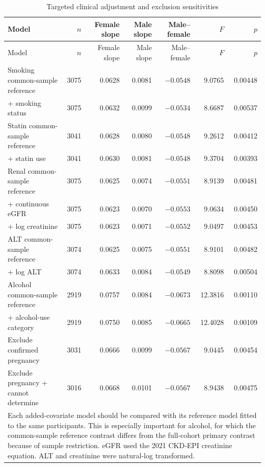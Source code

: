 \documentclass[11pt]{article}
\begin{document}
\begin{landscape}
\begin{longtable}{p{2.0in}rrrrrr}
\caption{Targeted clinical adjustment and exclusion sensitivities}
\label{tab:s3_targeted}\\
\toprule
Model & $n$ & Female slope & Male slope & Male--female & $F$ & $p$ \\
\midrule
\endfirsthead
\toprule
Model & $n$ & Female slope & Male slope & Male--female & $F$ & $p$ \\
\midrule
\endhead
Smoking common-sample reference & 3075 & 0.0628 & 0.0081 & $-0.0548$ & 9.0765 & 0.00448 \\
+ smoking status & 3075 & 0.0632 & 0.0099 & $-0.0534$ & 8.6687 & 0.00537 \\
\addlinespace
Statin common-sample reference & 3041 & 0.0628 & 0.0080 & $-0.0548$ & 9.2612 & 0.00412 \\
+ statin use & 3041 & 0.0630 & 0.0081 & $-0.0548$ & 9.3704 & 0.00393 \\
\addlinespace
Renal common-sample reference & 3075 & 0.0625 & 0.0074 & $-0.0551$ & 8.9139 & 0.00481 \\
+ continuous eGFR & 3075 & 0.0623 & 0.0070 & $-0.0553$ & 9.0634 & 0.00450 \\
+ log creatinine & 3075 & 0.0623 & 0.0071 & $-0.0552$ & 9.0497 & 0.00453 \\
\addlinespace
ALT common-sample reference & 3074 & 0.0625 & 0.0075 & $-0.0551$ & 8.9101 & 0.00482 \\
+ log ALT & 3074 & 0.0633 & 0.0084 & $-0.0549$ & 8.8098 & 0.00504 \\
\addlinespace
Alcohol common-sample reference & 2919 & 0.0757 & 0.0084 & $-0.0673$ & 12.3816 & 0.00110 \\
+ alcohol-use category & 2919 & 0.0750 & 0.0085 & $-0.0665$ & 12.4028 & 0.00109 \\
\addlinespace
Exclude confirmed pregnancy & 3031 & 0.0666 & 0.0099 & $-0.0567$ & 9.0445 & 0.00454 \\
Exclude pregnancy + cannot determine & 3016 & 0.0668 & 0.0101 & $-0.0567$ & 8.9438 & 0.00475 \\
\bottomrule
\multicolumn{7}{p{8.4in}}{\footnotesize
Each added-covariate model should be compared with its reference model fitted
to the same participants. This is especially important for alcohol, for which
the common-sample reference contrast differs from the full-cohort primary
contrast because of sample restriction. eGFR used the 2021 CKD-EPI
creatinine equation. ALT and creatinine were natural-log transformed.}\\
\end{longtable}
\end{landscape}
\end{document}
